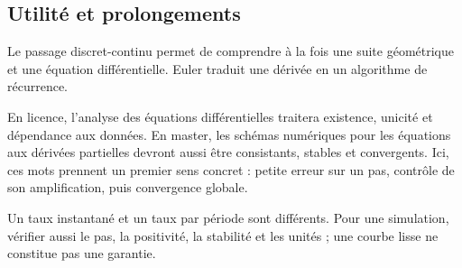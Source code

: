 \documentclass[../cours_1re.tex]{subfiles}
\begin{document}
\begin{finchapitre}
\section{Utilité et prolongements}
Le passage discret-continu permet de comprendre à la fois une suite géométrique et une équation différentielle. Euler traduit une dérivée en un algorithme de récurrence.

En licence, l'analyse des équations différentielles traitera existence, unicité et dépendance aux données. En master, les schémas numériques pour les équations aux dérivées partielles devront aussi être consistants, stables et convergents. Ici, ces mots prennent un premier sens concret : petite erreur sur un pas, contrôle de son amplification, puis convergence globale.
\begin{retenir}
Un taux instantané et un taux par période sont différents. Pour une simulation, vérifier aussi le pas, la positivité, la stabilité et les unités ; une courbe lisse ne constitue pas une garantie.
\end{retenir}
\end{finchapitre}
\end{document}
